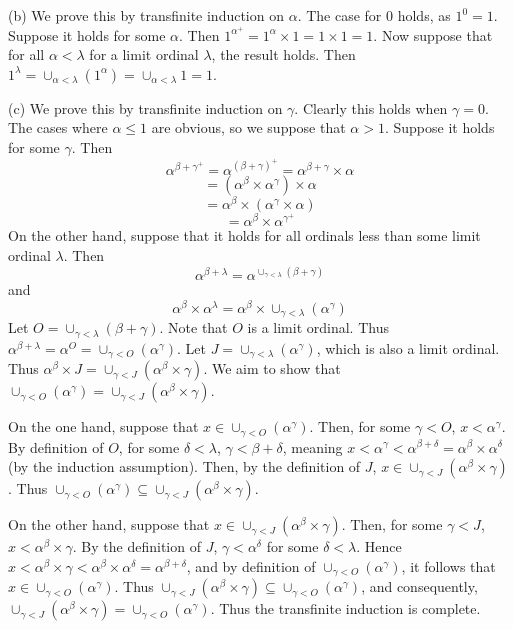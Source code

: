 \documentclass{article}
\theoremstyle{definition}
\begin{document}
(b) We prove this by transfinite induction on $\alpha$. The case for $0$ holds, as 
$1^0=1$. Suppose it holds for some $\alpha$. Then $1^{\alpha^+}=1^{\alpha}\times 1=1\times 1=1$. 
Now suppose that for all $\alpha<\lambda$ for a limit ordinal $\lambda$, the result holds. 
Then $1^\lambda=\cup_{\alpha<\lambda}(1^\alpha)=\cup_{\alpha<\lambda}1=1$.

(c) We prove this by transfinite induction on $\gamma$. Clearly this holds when $\gamma=0$. The cases where 
$\alpha\le 1$ are obvious, so we suppose that $\alpha>1$. Suppose it holds for some 
$\gamma$. Then
\[ \alpha^{\beta+\gamma^+}=\alpha^{(\beta+\gamma)^+}=\alpha^{\beta+\gamma}\times\alpha \]
\[ =(\alpha^\beta\times\alpha^\gamma)\times\alpha \]
\[ =\alpha^\beta\times(\alpha^\gamma\times\alpha) \]
\[ =\alpha^\beta\times\alpha^{\gamma^+} \]
On the other hand, suppose that it holds for all ordinals less than some limit ordinal $\lambda$. 
Then
\[ \alpha^{\beta+\lambda}=\alpha^{\cup_{\gamma<\lambda}(\beta+\gamma)} \]
and
\[ \alpha^\beta\times\alpha^\lambda=\alpha^\beta\times\cup_{\gamma<\lambda}(\alpha^\gamma) \]
Let $O=\cup_{\gamma<\lambda}(\beta+\gamma)$. Note that $O$ is a limit ordinal. Thus
$\alpha^{\beta+\lambda}=\alpha^{O}=\cup_{\gamma<O}(\alpha^\gamma)$. Let $J=\cup_{\gamma<\lambda}(\alpha^\gamma)$, which is 
also a limit ordinal. Thus $\alpha^\beta\times J=\cup_{\gamma<J}(\alpha^\beta\times\gamma)$. We aim to show that 
$\cup_{\gamma<O}(\alpha^\gamma)=\cup_{\gamma<J}(\alpha^\beta\times\gamma)$.

On the one hand, suppose that $x\in\cup_{\gamma<O}(\alpha^\gamma)$. Then, for some 
$\gamma<O$, $x<\alpha^\gamma$. By definition of $O$, for some $\delta<\lambda$, $\gamma<\beta+\delta$, meaning
$x<\alpha^\gamma<\alpha^{\beta+\delta}=\alpha^\beta\times\alpha^\delta$ (by the induction assumption). Then, by the definition of 
$J$, $x\in\cup_{\gamma<J}(\alpha^\beta\times\gamma)$. Thus $\cup_{\gamma<O}(\alpha^\gamma)\subseteq\cup_{\gamma<J}(\alpha^\beta\times\gamma)$.

On the other hand, suppose that $x\in\cup_{\gamma<J}(\alpha^\beta\times\gamma)$. Then, for some $\gamma<J$, 
$x<\alpha^\beta\times\gamma$. By the definition of $J$, $\gamma<\alpha^\delta$ for some $\delta<\lambda$. Hence 
$x<\alpha^\beta\times\gamma<\alpha^\beta\times\alpha^\delta=\alpha^{\beta+\delta}$, and by definition of $\cup_{\gamma<O}(\alpha^\gamma)$, 
it follows that $x\in\cup_{\gamma<O}(\alpha^\gamma)$. Thus $\cup_{\gamma<J}(\alpha^\beta\times\gamma)\subseteq\cup_{\gamma<O}(\alpha^\gamma)$, 
and consequently, $\cup_{\gamma<J}(\alpha^\beta\times\gamma)=\cup_{\gamma<O}(\alpha^\gamma)$. Thus the transfinite induction is complete.
\end{document}
